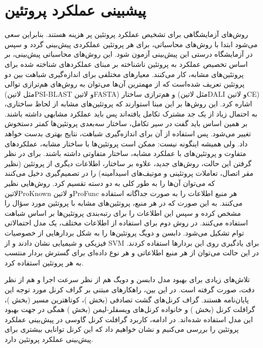 \section{پیشبینی عملکرد پروتئین}
 روش‌های آزمایشگاهی برای تشخیص عملکرد پروتئین پر هزینه هستند. بنابراین سعی می‌شود ابتدا با روش‌های محاسباتی، برای هر پروتئین عملکردی پیش‌بینی گردد و سپس در آزمایشگاه درستی این پیش‌بینی آزمون شود. این روش‌های محاسباتی پیش‌بینی، بر اساس تخصیص عملکرد به پروتئین ناشناخته بر مبنای عملکردهای شناخته شده برای پروتئین‌های مشابه، کار می‌کنند. معیارهای مختلفی برای اندازه‌گیری شباهت بین دو پروتئین تعریف شده‌است که از مهمترین آن‌ها می‌توان به روش‌های هم‌ترازی توالی (مثل ‌لاتین{PSI-BLAST} و ‌لاتین{FASTA}) و هم‌ترازی ساختار (مثل ‌لاتین{DALI} و ‌لاتین{CE}) اشاره کرد. این روش‌ها بر این مبنا استوارند که پروتئین‌های مشابه از لحاظ ساختاری، به احتمال زیاد از یک جد مشترک تکامل یافته‌اند پس باید عملکرد مشابهی داشته باشند. بر همین اساس باید گفت در سیر تکامل، ساختار سه‌بعدی پروتئین‌ها کمتر دستخوش تغییر می‌شود. پس استفاده از آن برای اندازه‌گیری شباهت، نتایج بهتری بدست خواهد داد. ولی همیشه اینگونه نیست: ممکن است پروتئین‌ها با ساختار مشابه، عملکردهای متفاوت و پروتئین‌های با عملکرد مشابه، ساختار متفاوتی داشته باشند. برای در نظر گرفتن این حالت، روش‌های جدید، علاوه بر ساختار، اطلاعات دیگری از پروتئین (نظیر مقر اتصال، تعاملات پروتئینی و موتیف‌های اسیدآمینه) را در تصمیم‌گیری دخیل می‌کنند که می‌توان آن‌ها را به طور کلی به دو دسته تقسیم کرد. روش‌هایی نظیر ‌لاتین{ProKnown} و ‌لاتین{ProFunc} هر منبع اطلاعات را به صورت جداگانه استفاده می‌کنند. به این صورت که در هر منبع، پروتئین‌های مشابه با پروتئین مورد سؤال را مشخص کرده و سپس این اطلاعات را برای رتبه‌بندی پروتئین‌ها بر اساس شباهت استفاده می‌کنند. در روش دوم برای استفاده از اطلاعات مختلف، یک مدل احتمالاتی توام تشکیل می‌شود. دابسن و دویگ  پروتئین‌ها را به شکل بردارهایی از خصوصیات فیزیکی و شیمیایی نشان دادند و از SVM برای یادگیری روی این بردارها استفاده کردند. در این حالت می‌توان از هر منبع اطلاعاتی و هر نوع داده‌ای برای گسترش بردار منتسب به هر پروتئین استفاده کرد.

تلاش‌های زیادی برای بهبود مدل دابسن و دویگ هم از نظر سرعت اجرا و هم از نظر دقت، صورت گرفته است. در این بین، راهکارهای مبتنی بر گراف کرنل مورد توجه این پایان‌نامه هستند. گراف کرنل‌های گشت تصادفی (بخش )، کوتاهترین مسیر (بخش )، گرافلت کرنل (بخش ) و خانواده کرنل‌های ویسفلر-لیمن (بخش ) همگی در جهت بهبود این مدل استفاده شده‌اند. در ادامه، کاربرد گرافلت کرنل گاوسی در پیش‌بینی عملکرد پروتئین را بررسی می‌کنیم و نشان خواهیم داد که این کرنل توانایی بیشتری برای پیش‌بینی عملکرد پروتئین دارد.

